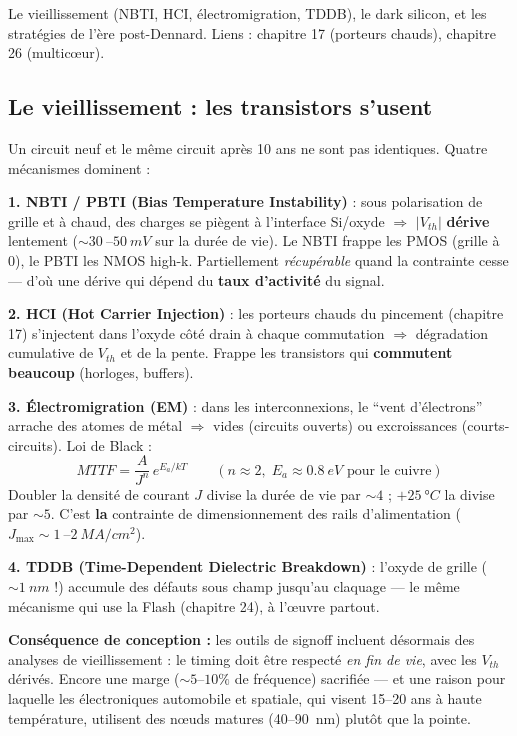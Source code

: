 \documentclass[12pt,a4paper,twoside]{book}
\begin{document}
\begin{ingenieur}
Le vieillissement (NBTI, HCI, électromigration, TDDB), le dark silicon, et les stratégies de l'ère post-Dennard. Liens : chapitre 17 (porteurs chauds), chapitre 26 (multicœur).
\end{ingenieur}

\subsection{Le vieillissement : les transistors s'usent}

\begin{formule}
Un circuit neuf et le même circuit après 10 ans ne sont pas identiques. Quatre mécanismes dominent :

\textbf{1. NBTI / PBTI (Bias Temperature Instability)} : sous polarisation de grille et à chaud, des charges se piègent à l'interface Si/oxyde $\Rightarrow$ $|V_{th}|$ \textbf{dérive} lentement ($\sim \SI{30}{}$--$\SI{50}{mV}$ sur la durée de vie). Le NBTI frappe les PMOS (grille à 0), le PBTI les NMOS high-k. Partiellement \textit{récupérable} quand la contrainte cesse --- d'où une dérive qui dépend du \textbf{taux d'activité} du signal.

\textbf{2. HCI (Hot Carrier Injection)} : les porteurs chauds du pincement (chapitre 17) s'injectent dans l'oxyde côté drain à chaque commutation $\Rightarrow$ dégradation cumulative de $V_{th}$ et de la pente. Frappe les transistors qui \textbf{commutent beaucoup} (horloges, buffers).

\textbf{3. Électromigration (EM)} : dans les interconnexions, le ``vent d'électrons'' arrache des atomes de métal $\Rightarrow$ vides (circuits ouverts) ou excroissances (courts-circuits). Loi de Black :
\[
\boxed{MTTF = \frac{A}{J^n}\, e^{E_a/kT}} \qquad (n \approx 2, \; E_a \approx \SI{0.8}{eV} \text{ pour le cuivre})
\]
Doubler la densité de courant $J$ divise la durée de vie par $\sim 4$ ; $+\SI{25}{°C}$ la divise par $\sim 5$. C'est \textbf{la} contrainte de dimensionnement des rails d'alimentation ($J_{\max} \sim \SI{1}{}$--$\SI{2}{MA/cm^2}$).

\textbf{4. TDDB (Time-Dependent Dielectric Breakdown)} : l'oxyde de grille ($\sim\SI{1}{nm}$ !) accumule des défauts sous champ jusqu'au claquage --- le même mécanisme qui use la Flash (chapitre 24), à l'œuvre partout.
\end{formule}

\begin{attention}
\textbf{Conséquence de conception :} les outils de signoff incluent désormais des analyses de vieillissement : le timing doit être respecté \textit{en fin de vie}, avec les $V_{th}$ dérivés. Encore une marge ($\sim 5$--$10\%$ de fréquence) sacrifiée --- et une raison pour laquelle les électroniques automobile et spatiale, qui visent 15--20 ans à haute température, utilisent des nœuds matures (\SI{40}{}--\SI{90}{nm}) plutôt que la pointe.
\end{attention}
\end{document}
